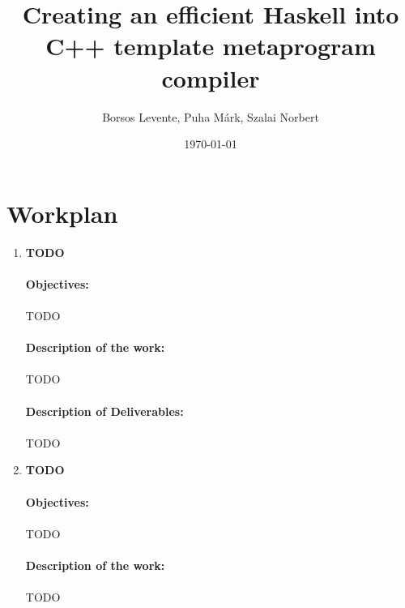 \documentclass{article}
\title{Creating an efficient Haskell into C++ template metaprogram compiler}
\date{\today}
\author{Borsos Levente, Puha Márk, Szalai Norbert}
\begin{document}
  \maketitle
  \newpage



\section{Workplan}

\begin{enumerate}[label=\textbf{WP\arabic*:}]
\newpage
\item \textbf{TODO}
\paragraph{Objectives:} \paragraph{}
TODO
\paragraph{Description of the work:} \paragraph{}
TODO
\paragraph{Description of Deliverables:} \paragraph{}
TODO

\newpage
\item \textbf{TODO}
\paragraph{Objectives:} \paragraph{}
TODO
\paragraph{Description of the work:} \paragraph{}
TODO

\end{enumerate}
\end{document}
